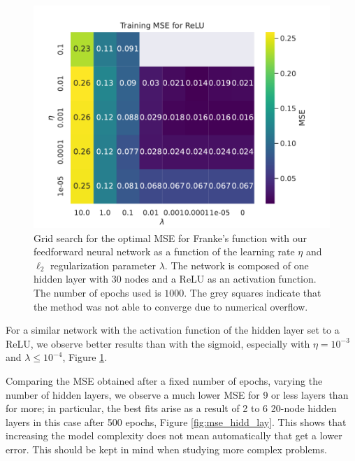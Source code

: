 \documentclass[aps,reprint,superscriptaddress,nofootinbib]{revtex4-2}
\begin{document}

\begin{figure}[htp]
    \centering
    \includegraphics[width=\linewidth]{figures/part_b/2_grid_search_relu.pdf}
    \caption{Grid search for the optimal MSE for Franke's function with our feedforward neural network as a function of the learning rate \(\eta\) and \(\ell_2\) regularization parameter \(\lambda\). The network is composed of one hidden layer with 30 nodes and a ReLU as an activation function. The number of epochs used is \(1000\). The grey squares indicate that the method was not able to converge due to numerical overflow.}
    \label{fig:nn_grid_mse_lmd_eta_relu}
\end{figure}

For a similar network with the activation function of the hidden layer set to a ReLU, we observe better results than with the sigmoid, especially with \(\eta=10^{-3}\) and \(\lambda\leq10^{-4}\), Figure \ref{fig:nn_grid_mse_lmd_eta_relu}.

Comparing the MSE obtained after a fixed number of epochs, varying the number of hidden layers, we observe a much lower MSE for 9 or less layers than for more; in particular, the best fits arise as a result of 2 to 6 20-node hidden layers in this case after 500 epochs, Figure \ref{fig:mse_hidd_lay}. This shows that increasing the model complexity does not mean automatically that get a lower error. This should be kept in mind when studying more complex problems.
\end{document}

